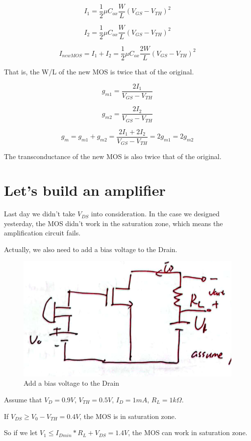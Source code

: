 \documentclass[fontset=windows]{article}
\begin{document}
$$I_1=\frac{1}{2} \mu C_{ox}\frac{W}{L}(V_{GS}-V_{TH})^2$$

$$I_2=\frac{1}{2} \mu C_{ox}\frac{W}{L}(V_{GS}-V_{TH})^2$$

$$I_{new MOS}=I_1+I_2=\frac{1}{2} \mu C_{ox}\frac{2W}{L}(V_{GS}-V_{TH})^2$$

That is, the W/L of the new MOS is twice that of the original. 

$$g_{m1}=\frac{2I_1}{V_{GS}-V_{TH}}$$

$$g_{m2}=\frac{2I_2}{V_{GS}-V_{TH}}$$

$$g_{m}=g_{m1}+g_{m2}=\frac{2I_1+2I_2}{V_{GS}-V_{TH}}=2g_{m1}=2g_{m2}$$

The transconductance of the new MOS is also twice that of the original. 

\section*{Let's build an amplifier}

Last day we didn't take $V_{DS}$ into consideration. In the case we designed yesterday, the MOS didn't work in the saturation zone, 
which means the amplification circuit fails. 

Actually, we also need to add a bias voltage to the Drain. 

\begin{figure}[htbp]
    \centering
    \includegraphics[scale=0.6]{3.jpg}
    \captionsetup{labelformat=empty}
    \caption{Add a bias voltage to the Drain}
    \label{3}
\end{figure}

Assume that $V_D=0.9V$, $V_{TH}=0.5V$, $I_D=1mA$, $R_L=1k\Omega$. 

If $V_{DS}\geq V_0-V_{TH}=0.4V$, the MOS is in saturation zone. 

So if we let $V_1\leq I_{Dmin}*R_L+V_{DS}=1.4V$, the MOS can work in saturation zone. 
\end{document}
